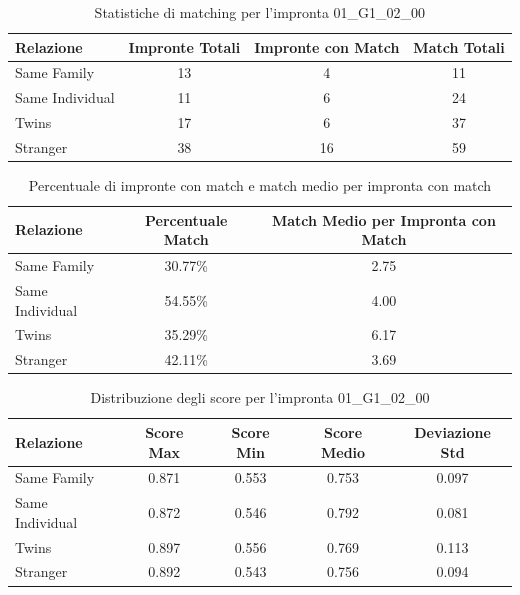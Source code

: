 \begin{table}[htbp]
\centering
\caption{Statistiche di matching per l'impronta 01\_G1\_02\_00}
\label{tab:results_01_G1_02_00}
\begin{tabular}{|l|c|c|c|}
\hline
\textbf{Relazione} & \textbf{Impronte Totali} & \textbf{Impronte con Match} & \textbf{Match Totali} \\
\hline
Same Family & 13 & 4 & 11 \\
\hline
Same Individual & 11 & 6 & 24 \\
\hline
Twins & 17 & 6 & 37 \\
\hline
Stranger & 38 & 16 & 59 \\
\hline
\end{tabular}
\end{table}


\begin{table}[htbp]
\centering
\caption{Percentuale di impronte con match e match medio per impronta con match}
\label{tab:match_percentage_01_G1_02_00}
\begin{tabular}{|l|c|c|}
\hline
\textbf{Relazione} & \textbf{Percentuale Match} & \textbf{Match Medio per Impronta con Match} \\
\hline
Same Family & 30.77\% & 2.75 \\
\hline
Same Individual & 54.55\% & 4.00 \\
\hline
Twins & 35.29\% & 6.17 \\
\hline
Stranger & 42.11\% & 3.69 \\
\hline
\end{tabular}
\end{table}


\begin{table}[htbp]
\centering
\caption{Distribuzione degli score per l'impronta 01\_G1\_02\_00}
\label{tab:scores_01_G1_02_00}
\begin{tabular}{|l|c|c|c|c|}
\hline
\textbf{Relazione} & \textbf{Score Max} & \textbf{Score Min} & \textbf{Score Medio} & \textbf{Deviazione Std} \\
\hline
Same Family & 0.871 & 0.553 & 0.753 & 0.097 \\
\hline
Same Individual & 0.872 & 0.546 & 0.792 & 0.081 \\
\hline
Twins & 0.897 & 0.556 & 0.769 & 0.113 \\
\hline
Stranger & 0.892 & 0.543 & 0.756 & 0.094 \\
\hline
\end{tabular}
\end{table}

